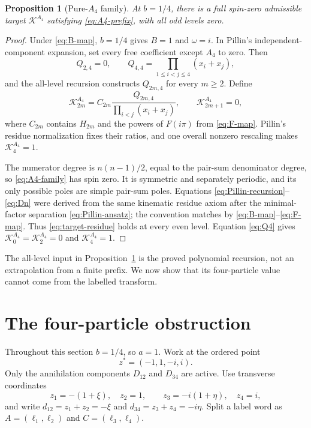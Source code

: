 \documentclass[11pt,reqno]{amsart}
\newtheorem{proposition}[theorem]{Proposition}
\theoremstyle{definition}
\theoremstyle{remark}
\newcommand{\cK}{\mathcal K}
\begin{document}
\begin{proposition}[Pure-$A_4$ family]
\label{prop:A4}
At $b=1/4$, there is a full spin-zero admissible target
$\cK^{A_4}$ satisfying \eqref{eq:A4-prefix}, with all odd levels zero.
\end{proposition}

\begin{proof}
Under \eqref{eq:B-map}, $b=1/4$ gives $B=1$ and $\omega=i$.  In Pillin's
independent-component expansion, set every free coefficient except $A_4$ to
zero.  Then
\begin{equation}
 Q_{2,4}=0,
 \qquad
 Q_{4,4}=\prod_{1\le i<j\le4}(x_i+x_j),
 \label{eq:Q4}
\end{equation}
and the all-level recursion constructs $Q_{2m,4}$ for every $m\ge2$.
Define
\begin{equation}
 \cK^{A_4}_{2m}
 =C_{2m}\frac{Q_{2m,4}}
 {\prod_{i<j}(x_i+x_j)},
 \qquad
 \cK^{A_4}_{2m+1}=0,
 \label{eq:A4-family}
\end{equation}
where $C_{2m}$ contains $H_{2m}$ and the powers of $F(i\pi)$ from
\eqref{eq:F-map}.  Pillin's residue normalization fixes their ratios, and one
overall nonzero rescaling makes $\cK_4^{A_4}=1$.

The numerator degree is $n(n-1)/2$, equal to the pair-sum denominator degree,
so \eqref{eq:A4-family} has spin zero.  It is symmetric and separately
periodic, and its only possible poles are simple pair-sum poles.  Equations
\eqref{eq:Pillin-recursion}--\eqref{eq:Dn} were derived from the same
kinematic residue axiom after the minimal-factor separation
\eqref{eq:Pillin-ansatz}; the convention matches by
\eqref{eq:B-map}--\eqref{eq:F-map}.  Thus \eqref{eq:target-residue} holds at
every even level.  Equation \eqref{eq:Q4} gives
$\cK_0^{A_4}=\cK_2^{A_4}=0$ and $\cK_4^{A_4}=1$.
\end{proof}

The all-level input in Proposition~\ref{prop:A4} is the proved polynomial
recursion, not an extrapolation from a finite prefix.  We now show that its
four-particle value cannot come from the labelled transform.

\section{The four-particle obstruction}
\label{sec:obstruction}

Throughout this section $b=1/4$, so $a=1$.  Work at the ordered point
\begin{equation}
 z^*=(-1,1,-i,i).
 \label{eq:zstar}
\end{equation}
Only the annihilation components $D_{12}$ and $D_{34}$ are active.  Use
transverse coordinates
\begin{equation}
 z_1=-(1+\xi),\quad z_2=1,
 \qquad
 z_3=-i(1+\eta),\quad z_4=i,
 \label{eq:transverse}
\end{equation}
and write $d_{12}=z_1+z_2=-\xi$ and
$d_{34}=z_3+z_4=-i\eta$.  Split a label word as
$A=(\ell_1,\ell_2)$ and $C=(\ell_3,\ell_4)$.
\end{document}
